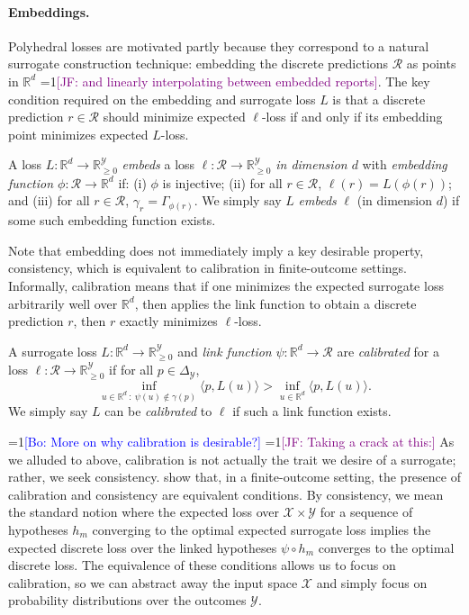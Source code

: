 \documentclass[anon]{colt2020} %
\newcommand{\Comments}{1}
\newcommand{\mynote}[2]{\ifnum\Comments=1\textcolor{#1}{#2}\fi}
\newcommand{\jessie}[1]{\mynote{purple}{[JF: #1]}}
\newcommand{\bo}[1]{\mynote{blue}{[Bo: #1]}}
\newcommand{\reals}{\mathbb{R}}
\newcommand{\nonnegreals}{\reals_{\geq 0}}%
\newcommand{\simplex}{\Delta_\Y}
\newcommand{\R}{\mathcal{R}}
\newcommand{\X}{\mathcal{X}}
\newcommand{\Y}{\mathcal{Y}}
\newcommand{\inprod}[2]{\langle #1, #2 \rangle}%
\begin{document}
\paragraph{Embeddings.}
Polyhedral losses are motivated partly because they correspond to a natural surrogate construction technique: embedding the discrete predictions $\R$ as points in $\reals^d$ \jessie{and linearly interpolating between embedded reports}.
The key condition required on the embedding and surrogate loss $L$ is that a discrete prediction $r \in \R$ should minimize expected $\ell$-loss if and only if its embedding point minimizes expected $L$-loss.
%
\begin{definition}
  A loss $L: \reals^d \to \nonnegreals^{\Y}$ \emph{embeds} a loss $\ell: \R \to \nonnegreals^{\Y}$ \emph{in dimension $d$} with \emph{embedding function $\phi: \R \to \reals^d$} if: (i) $\phi$ is injective; (ii) for all $r \in \R$, $\ell(r) = L(\phi(r))$; and (iii) for all $r \in \R$, $\gamma_r = \Gamma_{\phi(r)}$.
  We simply say $L$ \emph{embeds} $\ell$ (in dimension $d$) if some such embedding function exists.
\end{definition}
%
Note that embedding does not immediately imply a key desirable property, consistency, which is equivalent to calibration in finite-outcome settings.
Informally, calibration means that if one minimizes the expected surrogate loss arbitrarily well over $\reals^d$, then applies the link function to obtain a discrete prediction $r$, then $r$ exactly minimizes $\ell$-loss.
\begin{definition}\label{def:calibration}
  A surrogate loss $L: \reals^d \to \nonnegreals^{\Y}$ and \emph{link function} $\psi: \reals^d \to \R$ are \emph{calibrated} for a loss $\ell: \R \to \nonnegreals^{\Y}$ if for all $p \in \simplex$,
    \[ \inf_{u \in \reals^d ~:~ \psi(u) \not\in \gamma(p)} \inprod{p}{L(u)}  > \inf_{u \in \reals^d} \inprod{p}{L(u)}  .\]
  We simply say $L$ can be \emph{calibrated} to $\ell$ if such a link function exists.
\end{definition}
\bo{More on why calibration is desirable?}
\jessie{Taking a crack at this:}
As we alluded to above, calibration is not actually the trait we desire of a surrogate; rather, we seek consistency.
\cite{tewari2007consistency} show that, in a finite-outcome setting, the presence of calibration and consistency are equivalent conditions.
By consistency, we mean the standard notion where the expected loss over $\X \times \Y$ for a sequence of hypotheses $h_m$ converging to the optimal expected surrogate loss implies the expected discrete loss over the linked hypotheses $\psi \circ h_m$ converges to the optimal discrete loss.
The equivalence of these conditions allows us to focus on calibration, so we can abstract away the input space $\X$ and simply focus on probability distributions over the outcomes $\Y$.
\end{document}
